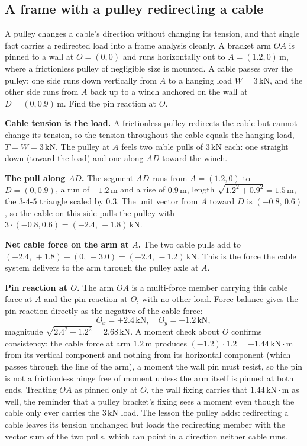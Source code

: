 \subsection{A frame with a pulley redirecting a cable}

A pulley changes a cable's direction without changing its tension, and that
single fact carries a redirected load into a frame analysis cleanly. A bracket
arm $OA$ is pinned to a wall at $O = (0,0)$ and runs horizontally out to
$A = (1.2, 0)\,\si{\meter}$, where a frictionless pulley of negligible size is
mounted. A cable passes over the pulley: one side runs down vertically from
$A$ to a hanging load $W = 3\,\text{kN}$, and the other side runs from $A$ back
up to a winch anchored on the wall at $D = (0, 0.9)\,\si{\meter}$. Find the pin
reaction at $O$.

\textbf{Cable tension is the load.} A frictionless pulley redirects the cable
but cannot change its tension, so the tension throughout the cable equals the
hanging load, $T = W = 3\,\text{kN}$. The pulley at $A$ feels two cable pulls
of $3\,\text{kN}$ each: one straight down (toward the load) and one along $AD$
toward the winch.

\textbf{The pull along $AD$.} The segment $AD$ runs from $A = (1.2, 0)$ to
$D = (0, 0.9)$, a run of $-1.2\,\si{\meter}$ and a rise of $0.9\,\si{\meter}$,
length $\sqrt{1.2^2 + 0.9^2} = 1.5\,\si{\meter}$, the $3$-$4$-$5$ triangle
scaled by $0.3$. The unit vector from $A$ toward $D$ is
$(-0.8,\,0.6)$, so the cable on this side pulls the pulley with
$3 \cdot (-0.8, 0.6) = (-2.4,\,+1.8)\,\text{kN}$.

\textbf{Net cable force on the arm at $A$.} The two cable pulls add to
$(-2.4,\,+1.8) + (0,\,-3.0) = (-2.4,\,-1.2)\,\text{kN}$. This is the force the
cable system delivers to the arm through the pulley axle at $A$.

\textbf{Pin reaction at $O$.} The arm $OA$ is a multi-force member carrying
this cable force at $A$ and the pin reaction at $O$, with no other load. Force
balance gives the pin reaction directly as the negative of the cable force:
\[
O_x = +2.4\,\text{kN}, \quad O_y = +1.2\,\text{kN},
\]
magnitude $\sqrt{2.4^2 + 1.2^2} = 2.68\,\text{kN}$. A moment check about $O$
confirms consistency: the cable force at arm $1.2\,\si{\meter}$ produces
$(-1.2)\cdot 1.2 = -1.44\,\text{kN}\cdot\text{m}$ from its vertical component
and nothing from its horizontal component (which passes through the line of
the arm), a moment the wall pin must resist, so the pin is not a frictionless
hinge free of moment unless the arm itself is pinned at both ends. Treating
$OA$ as pinned only at $O$, the wall fixing carries that
$1.44\,\text{kN}\cdot\text{m}$ as well, the reminder that a pulley bracket's
fixing sees a moment even though the cable only ever carries the
$3\,\text{kN}$ load. The lesson the pulley adds: redirecting a cable leaves
its tension unchanged but loads the redirecting member with the vector sum of
the two pulls, which can point in a direction neither cable runs.

